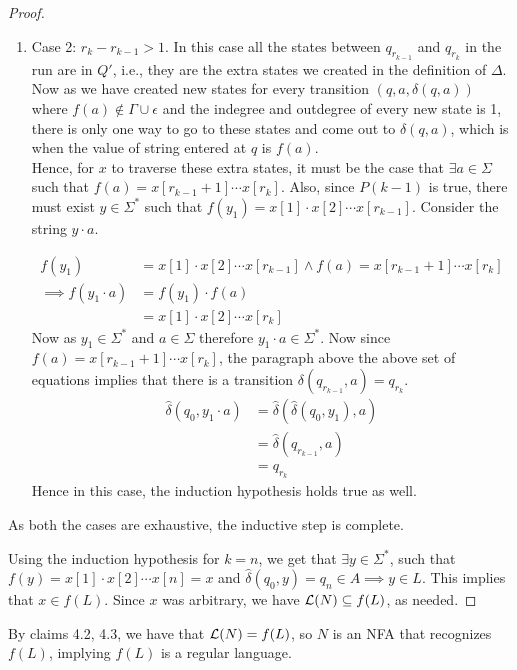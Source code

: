 \begin{soln}
\begin{proof}
\begin{enumerate}
			\item
                Case 2: $r_k-r_{k-1} >1$. In this case all the states between $q_{r_{k-1}}$ and $q_{r_k}$ in the run are in $Q'$, i.e., they are the extra states we created in the definition of
                $\Delta$.\\
                Now as we have created new states for every transition $(q,a,\delta(q,a))$ where  $f(a) \not\in \Gamma \cup \epsilon$ and the indegree and outdegree of every new state is 1, there is
                only one way to go to these states and come out to $\delta(q,a)$, which is when the value of string entered at $q$ is $f(a)$.\\
                Hence, for $x$ to traverse these extra states, it must be
                the case that $\exists a \in \Sigma$ such that $f(a)=x[r_{k-1}+1] \cdots x[r_{k}]$. Also, since $P(k-1)$ is true, there must exist $y \in \Sigma^*$ such that $f(y_1) = x[1]
                \cdot x[2] \cdots x[r_{k-1}]$. Consider the string $y \cdot a$.

			      \begin{align*}
				      f(y_1)        & =x[1] \cdot x[2] \cdots x[r_{k-1}] \land f(a) = x[r_{k-1}+1] \cdots x[r_{k}] \\
				      \implies f(y_1\cdot a) & =f(y_1)\cdot f(a)                                         \\
                                             &=x[1] \cdot x[2] \cdots x[r_{k}]
			      \end{align*}
			      Now as $y_1 \in \Sigma^*$ and $a \in \Sigma$ therefore $y_1\cdot a \in \Sigma^*$. Now since $f(a)=x[r_{k-1}+1] \cdots x[r_{k}]$, the paragraph above the above set of
                  equations implies that there is a transition $\delta(q_{r_{k-1}}, a) = q_{r_k}$.
			      \begin{align*}
				      \hat\delta(q_0,y_1\cdot a) & =\hat\delta(\hat\delta(q_0,y_1),a) \\
				       & =\hat\delta(q_{r_{k-1}},a)         \\
				       & =q_{r_k}
			      \end{align*}
			      Hence in this case, the induction hypothesis holds true as well.
		\end{enumerate}

		As both the cases are exhaustive, the inductive step is complete.

        Using the induction hypothesis for $k = n$, we get that $\exists y \in \Sigma^*$, such that $f(y) = x[1] \cdot x[2] \cdots x[n] = x$ and $\hat\delta(q_0,y)=q_n \in A \implies y \in L$. This implies that $x\in
        f(L)$. Since $x$ was arbitrary, we have $\mathcal{L}(N) \subseteq f(L)$, as needed.
	\end{proof}
	By claims 4.2, 4.3, we have that $\mathcal{L}(N) = f(L)$, so $N$ is an NFA that recognizes $f(L)$, implying $f(L)$ is a regular language.
\end{soln}
